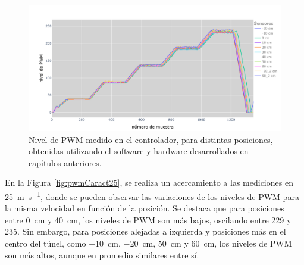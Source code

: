 \begin{figure}[H]
    \centering
    \includegraphics[width=0.95\linewidth]{Figuras/resultados/caracterizacion/pwmCaracterizacion.png}
    \caption{Nivel de PWM medido en el controlador, para distintas posiciones, obtenidas utilizando el software y hardware desarrollados en capítulos anteriores.}
    \label{fig:pwmCaracterizacion}
\end{figure}




En la Figura \ref{fig:pwmCaract25}, se realiza un acercamiento a las mediciones en \SI{25}{\meter\per\second}, donde se pueden observar las variaciones de los niveles de PWM para la misma velocidad en función de la posición. Se destaca que para posiciones entre \SI{0}{\centi\meter} y \SI{40}{\centi\meter}, los niveles de PWM son más bajos, oscilando entre 229 y 235. Sin embargo, para posiciones alejadas a izquierda y posiciones más en el centro del túnel, como \SI{-10}{\centi\meter}, \SI{-20}{\centi\meter}, \SI{50}{\centi\meter} y \SI{60}{\centi\meter}, los niveles de PWM son más altos, aunque en promedio similares entre sí. 

